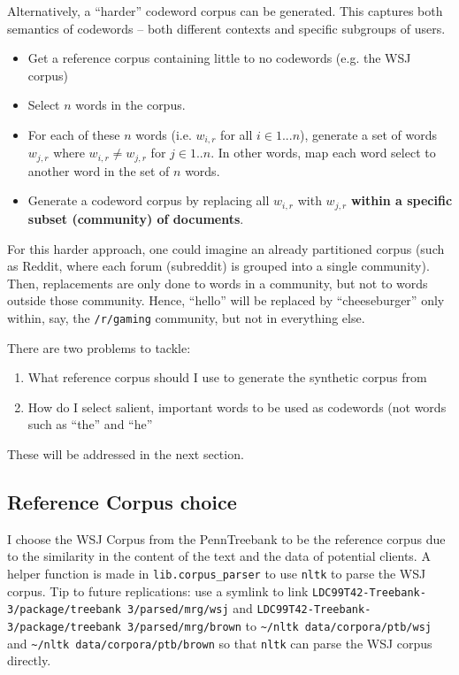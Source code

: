 Alternatively, a ``harder'' codeword corpus can be generated. This captures both semantics of codewords -- both different contexts and specific subgroups of users.

\begin{itemize}
\item Get a reference corpus containing little to no codewords (e.g. the WSJ corpus)
\item Select $n$ words in the corpus.
\item For each of these $n$ words (i.e. $w_{i, r}$ for all $i \in 1 ... n$), generate a set of words $w_{j, r}$ where $w_{i, r} \neq w_{j, r}$ for $j \in 1 .. n$. In other words, map each word select to another word in the set of $n$ words.
\item Generate a codeword corpus by replacing all $w_{i, r}$ with $w_{j, r}$ \textbf{within a specific subset (community) of documents}.
\end{itemize}

For this harder approach, one could imagine an already partitioned corpus (such as Reddit, where each forum (subreddit) is grouped into a single community). Then, replacements are only done to words in a community, but not to words outside those community. Hence, ``hello'' will be replaced by ``cheeseburger'' only within, say, the \texttt{/r/gaming} community, but not in everything else.

There are two problems to tackle:

\begin{enumerate}
\item What reference corpus should I use to generate the synthetic corpus from
\item How do I select salient, important words to be used as codewords (not words such as ``the'' and ``he''
\end{enumerate}

These will be addressed in the next section.

\subsection{Reference Corpus choice}

I choose the WSJ Corpus from the PennTreebank to be the reference corpus due to the similarity in the content of the text and the data of potential clients. A helper function is made in \lstinline{lib.corpus_parser} to use \lstinline{nltk} to parse the WSJ corpus. Tip to future replications: use a symlink to link \lstinline{LDC99T42-Treebank-3/package/treebank 3/parsed/mrg/wsj} and \lstinline{LDC99T42-Treebank-3/package/treebank 3/parsed/mrg/brown} to \lstinline{~/nltk data/corpora/ptb/wsj} and \lstinline{~/nltk data/corpora/ptb/brown} so that \lstinline{nltk} can parse the WSJ corpus directly.

